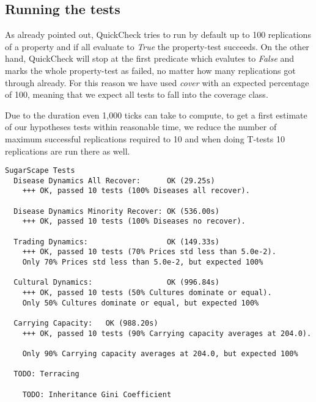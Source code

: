 
\subsection{Running the tests}
As already pointed out, QuickCheck tries to run by default up to 100 replications  of a property and if all evaluate to \textit{True} the property-test succeeds. On the other hand, QuickCheck will stop at the first predicate which evalutes to \textit{False} and marks the whole property-test as failed, no matter how many replications got through already. For this reason we have used \textit{cover} with an expected percentage of 100, meaning that we expect all tests to fall into the coverage class. 

Due to the duration even 1,000 ticks can take to compute, to get a first estimate of our hypotheses tests within reasonable time, we reduce the number of maximum successful replications required to 10 and when doing T-tests 10 replications are run there as well. 

\begin{verbatim}
SugarScape Tests
  Disease Dynamics All Recover:      OK (29.25s)
    +++ OK, passed 10 tests (100% Diseases all recover).
    
  Disease Dynamics Minority Recover: OK (536.00s)
    +++ OK, passed 10 tests (100% Diseases no recover).
    
  Trading Dynamics:                  OK (149.33s)
    +++ OK, passed 10 tests (70% Prices std less than 5.0e-2).
    Only 70% Prices std less than 5.0e-2, but expected 100%
    
  Cultural Dynamics:                 OK (996.84s)
    +++ OK, passed 10 tests (50% Cultures dominate or equal).
    Only 50% Cultures dominate or equal, but expected 100%
    
  Carrying Capacity:   OK (988.20s)
    +++ OK, passed 10 tests (90% Carrying capacity averages at 204.0).
    
    Only 90% Carrying capacity averages at 204.0, but expected 100%
    
  TODO: Terracing
  
    TODO: Inheritance Gini Coefficient
\end{verbatim}

